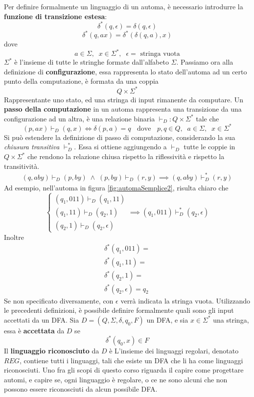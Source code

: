 \documentclass[10pt, letterpaper]{report}
\begin{document}
Per definire formalmente un linguaggio di un automa, è 
necessario introdurre la \textbf{funzione di transizione estesa}:
$$ \delta^*(q,\epsilon)=\delta(q,\epsilon)$$
$$\delta^*(q,ax)=\delta^*(\delta(q,a),x)$$
dove
$$ a\in \Sigma,\;\;x\in \Sigma^*,\;\;\epsilon = \text{ stringa vuota}$$
$\Sigma^*$ è l'insieme di tutte le stringhe formate dall'alfabeto 
$\Sigma$. Passiamo ora alla definizione di \textbf{configurazione}, essa 
rappresenta lo stato dell'automa ad un certo punto della 
computazione,  è formata da una coppia 
$$ Q\times \Sigma^*$$
Rappresentante uno stato, ed una stringa di input rimanente da 
computare.\acc 
Un \textbf{passo della computazione} in un automa rappresenta 
una transizione da una configurazione ad un altra, è una 
relazione binaria $\vdash_D : Q\times \Sigma^*$ tale che 
$$ 
(p,ax)\vdash_D (q,x)\iff \delta(p,a)=q \;\;\text{ dove }\;\;
p,q\in Q,\;\;a\in\Sigma,\;\;x\in\Sigma^*$$
Si può estendere la definizione di passo di computazione, 
considerando la sua \textit{chiusura transitiva} 
$\vdash_D^*$. Essa si ottiene aggiungendo a $\vdash_D$ tutte 
le coppie in $ Q\times \Sigma^*$ che rendono 
la relazione chiusa rispetto la riflessività e rispetto 
la transitività.
$$ \begin{matrix}
    (q,aby)\vdash_D (p,by) \;\land\;  
    (p,by)\vdash_D (r,y) \implies 
    (q,aby)\vdash_D^*(r,y)
\end{matrix}$$
Ad esempio, nell'automa in figura \ref{fig:automaSemplice2}, 
risulta chiaro che 
$$\begin{cases}
    (q_1,011)\vdash_D (q_1,11)\\
    (q_1,11) \vdash_D (q_2,1)\\
    (q_2,1) \vdash_D (q_2,\epsilon)
\end{cases} \implies
(q_1,011) \vdash_D^* (q_2,\epsilon)$$
Inoltre$$ \begin{matrix}
    \delta^*(q_1,011) = \\ 
    \delta^*(q_1,11)  = \\ 
    \delta^*(q_2,1) = \\ 
    \delta^*(q_2,\epsilon) = q_2
\end{matrix}$$
Se non specificato diversamente, con $\epsilon$ verrà indicata 
la stringa vuota. Utilizzando le precedenti definizioni, è possibile definire formalmente 
quali sono gli input accettati da un DFA.\acc 
{}  Sia $D=(Q,\Sigma,\delta, q_0, F)$ un DFA, e sia $x\in \Sigma^*$ una stringa, essa 
è \textbf{accettata} da $D$ se $$ \delta^*(q_0,x)\in F$$
Il \textbf{linguaggio riconosciuto} da $D$ è 
  L'insieme dei linguaggi regolari, denotato $REG$, contiene tutti 
i linguaggi, tali che esiste un DFA che li ha come linguaggi riconosciuti.
Uno fra gli scopi di questo corso riguarda il capire come progettare automi, e capire se, 
ogni linguaggio è regolare, o ce ne sono alcuni che non possono essere riconosciuti da 
alcun possibile DFA. 
\end{document}
